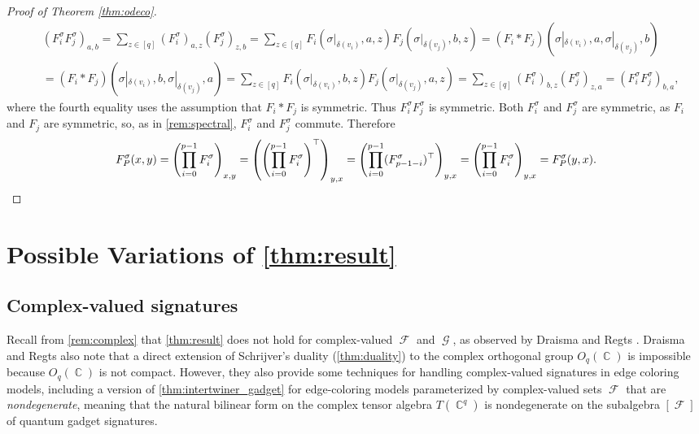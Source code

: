 \documentclass{article}
\DeclareMathOperator{\cc}{\mathbb{C}}
\DeclareMathOperator{\fc}{\mathcal{F}}
\DeclareMathOperator{\gc}{\mathcal{G}}
\begin{document}
\begin{proof}[Proof of Theorem \ref{thm:odeco}]
    \begin{align*}
        &(F_i^\sigma F_j^\sigma)_{a,b} = \sum_{z \in [q]} (F_i^\sigma)_{a,z} (F_j^\sigma)_{z,b}
        = \sum_{z \in [q]} F_i(\sigma|_{\delta(v_i)}, a,z) F_j(\sigma|_{\delta(v_j)}, b,z)
        = (F_i * F_j)(\sigma|_{\delta(v_i)}, a, \sigma|_{\delta(v_j)}, b) \\
        &= (F_i * F_j)(\sigma|_{\delta(v_i)}, b, \sigma|_{\delta(v_j)}, a)
        = \sum_{z \in [q]} F_i(\sigma|_{\delta(v_i)}, b,z) F_j(\sigma|_{\delta(v_j)}, a,z) 
        = \sum_{z \in [q]} (F_i^\sigma)_{b,z} (F_j^\sigma)_{z,a}
        = (F_i^\sigma F_j^\sigma)_{b,a},
        \label{eq:swap}
    \end{align*}
    where the fourth equality uses the assumption that $F_i * F_j$ is symmetric.
    Thus $F_i^\sigma F_j^\sigma$ is symmetric. Both $F_i^\sigma$ 
    and $F_j^\sigma$ are symmetric, as $F_i$ and $F_j$ are symmetric, so, as in \autoref{rem:spectral},
    $F^\sigma_i$ and $F^\sigma_j$ commute. Therefore
    \[
        F^\sigma_P(x,y)
        = \left(\prod_{i=0}^{p-1} F^\sigma_i\right)_{x,y}
        = \left(\left(\prod_{i=0}^{p-1} F^\sigma_i\right)^\top\right)_{y,x}
        = \left(\prod_{i=0}^{p-1} (F^\sigma_{p-1-i})^\top\right)_{y,x}
        = \left(\prod_{i=0}^{p-1} F^\sigma_i\right)_{y,x}
        = F^\sigma_P(y,x). \qedhere
    \]
\end{proof}

\section{Possible Variations of \autoref{thm:result}}
\label{sec:variations}
\subsection{Complex-valued signatures}
\label{sec:complex}
Recall from \autoref{rem:complex} that \autoref{thm:result} does not hold for complex-valued
$\fc$ and $\gc$, as observed by Draisma and Regts \cite{draisma_tensor_2013}.
Draisma and Regts also note that a direct extension of Schrijver's duality 
(\autoref{thm:duality}) to the complex
orthogonal group $O_q(\cc)$ is impossible because $O_q(\cc)$ is not compact. However, they
also provide some techniques for handling complex-valued
signatures in edge coloring models, including a version \cite[Theorem 3]{draisma_tensor_2013} of \autoref{thm:intertwiner_gadget}
for edge-coloring models parameterized by complex-valued sets $\fc$ that are
\emph{nondegenerate}, meaning that the natural bilinear form on the complex tensor
algebra $T(\cc^q)$ is nondegenerate on the subalgebra $[\fc]$ of quantum gadget signatures.
\end{document}
